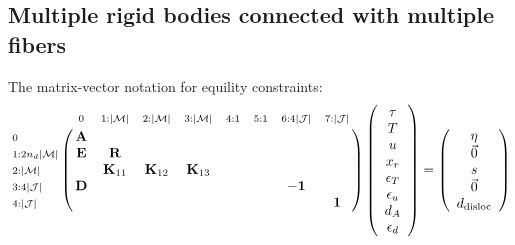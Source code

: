 \documentclass[a4paper,10pt]{article}
\begin{document}
\subsection{Multiple rigid bodies connected with multiple fibers}
The matrix-vector notation for equility constraints:
\begin{equation}\notag
\bordermatrix{
                                        & \scriptstyle{0      }        &   \scriptstyle{1 : |\mathcal{M}|}           &  \scriptstyle{2 : |\mathcal{M}|}           & \scriptstyle{3 : |\mathcal{M}|}            &  \scriptstyle{4 : 1}    & \scriptstyle{5 : 1}    &  \scriptstyle{6:4| \mathcal{J} | }  &  \scriptstyle{7 : | \mathcal{J} |}        \cr
\scriptstyle{0      }                   &\mathbf{A}                    &                                             &                                            &                                            &                         &                        &                                     &                                           \cr
\scriptstyle{1 : 2n_d|\mathcal{M}|}     &\mathbf{E}                    &   \mathbf{R}                                &                                            &                                            &                         &                        &                                     &                                           \cr
\scriptstyle{2 : |\mathcal{M}|}         &                              &   \mathbf{K}_{11}                           &  \mathbf{K}_{12}                           & \mathbf{K}_{13}                            &                         &                        &                                     &                                           \cr
\scriptstyle{3 : 4| \mathcal{J} | }     &\mathbf{D}                    &                                             &                                            &                                            &                         &                        &  -\mathbf{1}                        &                                           \cr
\scriptstyle{4 : | \mathcal{J} | }      &                              &                                             &                                            &                                            &                         &                        &                                     &  \mathbf{1}
}
\left(\begin{array}{c}
\tau  \\
T \\
u \\
x_r \\ 
\epsilon_T \\
\epsilon_u \\
d_A \\ 
\epsilon_d
\end{array}\right)
=
\left(\begin{array}{c}
\eta       \\
\vec{0}    \\
s          \\
\vec{0}    \\
d_\text{disloc}
\end{array}\right)
\end{equation}
\end{document}
